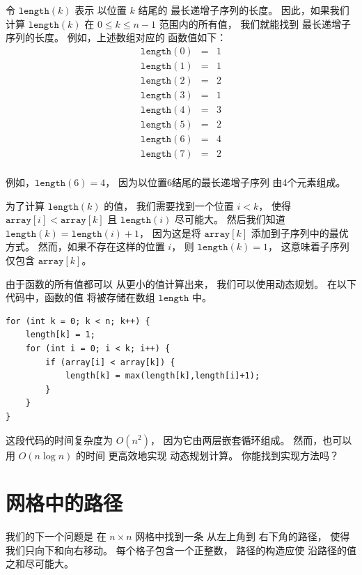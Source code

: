 令 $\texttt{length}(k)$ 表示
以位置 $k$ 结尾的
最长递增子序列的长度。
因此，如果我们计算
$\texttt{length}(k)$ 在 $0 \le k \le n-1$ 范围内的所有值，
我们就能找到
最长递增子序列的长度。
例如，上述数组对应的
函数值如下：
\[
\begin{array}{lcl}
\texttt{length}(0) & = & 1 \\
\texttt{length}(1) & = & 1 \\
\texttt{length}(2) & = & 2 \\
\texttt{length}(3) & = & 1 \\
\texttt{length}(4) & = & 3 \\
\texttt{length}(5) & = & 2 \\
\texttt{length}(6) & = & 4 \\
\texttt{length}(7) & = & 2 \\
\end{array}
\]

例如，$\texttt{length}(6)=4$，
因为以位置6结尾的最长递增子序列
由4个元素组成。

为了计算 $\texttt{length}(k)$ 的值，
我们需要找到一个位置 $i<k$，
使得 $\texttt{array}[i]<\texttt{array}[k]$
且 $\texttt{length}(i)$ 尽可能大。
然后我们知道
$\texttt{length}(k)=\texttt{length}(i)+1$，
因为这是将 $\texttt{array}[k]$ 
添加到子序列中的最优方式。
然而，如果不存在这样的位置 $i$，
则 $\texttt{length}(k)=1$，
这意味着子序列仅包含
$\texttt{array}[k]$。

由于函数的所有值都可以
从更小的值计算出来，
我们可以使用动态规划。
在以下代码中，函数的值
将被存储在数组
$\texttt{length}$ 中。

\begin{lstlisting}
for (int k = 0; k < n; k++) {
    length[k] = 1;
    for (int i = 0; i < k; i++) {
        if (array[i] < array[k]) {
            length[k] = max(length[k],length[i]+1);
        }
    }
}
\end{lstlisting}

这段代码的时间复杂度为 $O(n^2)$，
因为它由两层嵌套循环组成。
然而，也可以用 $O(n \log n)$ 的时间
更高效地实现
动态规划计算。
你能找到实现方法吗？

\section{网格中的路径}

我们的下一个问题是
在 $n \times n$ 网格中找到一条
从左上角到
右下角的路径，
使得我们只向下和向右移动。
每个格子包含一个正整数，
路径的构造应使
沿路径的值之和尽可能大。

